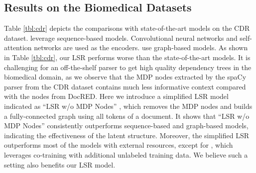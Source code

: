 \documentclass[11pt,a4paper]{article}
\begin{document}
\subsection{Results on the Biomedical Datasets}
\begin{table}[]
\centering
{}
\vspace{-1mm}
\caption{\label{tbl:cdr}  Results on the test set of the CDR dataset. The methods below the double line take advantage of additional training data and/or incorporate external tools.}
\vspace{-5mm}
\end{table}

 Table \ref{tbl:cdr} depicts the comparisons with state-of-the-art models on the CDR dataset. \citet{Gu2017ChemicalinducedDR, Nguyen2018ConvolutionalNN, Verga2018SimultaneouslyST} leverage sequence-based models. Convolutional neural networks and self-attention networks are used as the encoders. \citet{Sahu2019IntersentenceRE, christopoulou2019connecting} use graph-based models. As shown in Table \ref{tbl:cdr}, our LSR performs worse than the state-of-the-art models. It is challenging for an off-the-shelf parser to get high quality dependency trees in the biomedical domain, as we observe that the MDP nodes extracted by the spaCy parser from the CDR dataset contains much less informative context compared with the nodes from DocRED. Here we introduce a simplified LSR model indicated as ``LSR w/o MDP Nodes'' , which removes the MDP nodes and builds a fully-connected graph using all tokens of a document. It shows that ``LSR w/o MDP Nodes'' consistently outperforms sequence-based and graph-based models, indicating the effectiveness of the latent structure. Moreover, the simplified LSR outperforms most of the models with external resources, except for \citet{Li2016CIDExtractorAC}, which leverages co-training with additional unlabeled training data. We believe such a setting also benefits our LSR model.
\end{document}
